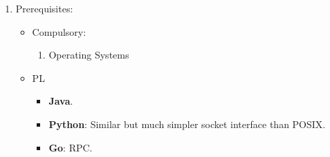 \documentclass{article}
\begin{document}
\begin{enumerate}
    \item Prerequisites:
    \begin{itemize}
        \item Compulsory:
            \begin{enumerate}
            \item Operating Systems
            \end{enumerate}
        \item PL
        \begin{itemize}
            \item \textbf{Java}.
            \item \textbf{Python}: Similar but much simpler socket interface than POSIX.
            \item \textbf{Go}: RPC.
        \end{itemize}
    \end{itemize}
\end{enumerate}
\end{document}
